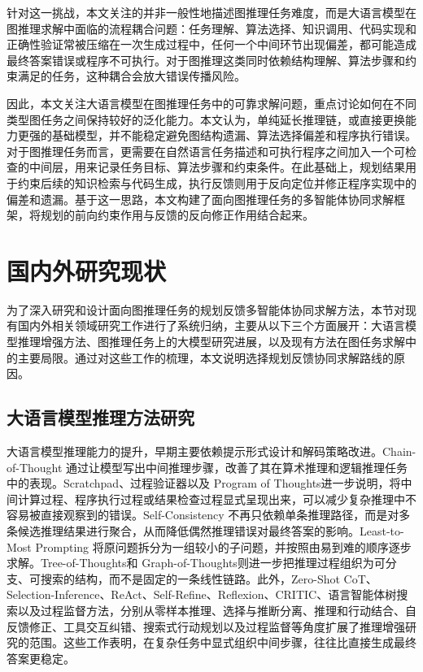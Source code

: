 针对这一挑战，本文关注的并非一般性地描述图推理任务难度，而是大语言模型在图推理求解中面临的流程耦合问题：任务理解、算法选择、知识调用、代码实现和正确性验证常被压缩在一次生成过程中，任何一个中间环节出现偏差，都可能造成最终答案错误或程序不可执行。对于图推理这类同时依赖结构理解、算法步骤和约束满足的任务，这种耦合会放大错误传播风险。

因此，本文关注大语言模型在图推理任务中的可靠求解问题，重点讨论如何在不同类型图任务之间保持较好的泛化能力。本文认为，单纯延长推理链，或直接更换能力更强的基础模型，并不能稳定避免图结构遗漏、算法选择偏差和程序执行错误。对于图推理任务而言，更需要在自然语言任务描述和可执行程序之间加入一个可检查的中间层，用来记录任务目标、算法步骤和约束条件。在此基础上，规划结果用于约束后续的知识检索与代码生成，执行反馈则用于反向定位并修正程序实现中的偏差和遗漏。基于这一思路，本文构建了面向图推理任务的多智能体协同求解框架，将规划的前向约束作用与反馈的反向修正作用结合起来。


\section{国内外研究现状}

为了深入研究和设计面向图推理任务的规划反馈多智能体协同求解方法，本节对现有国内外相关领域研究工作进行了系统归纳，主要从以下三个方面展开：大语言模型推理增强方法、图推理任务上的大模型研究进展，以及现有方法在图任务求解中的主要局限。通过对这些工作的梳理，本文说明选择规划反馈协同求解路线的原因。

\subsection{大语言模型推理方法研究}

大语言模型推理能力的提升，早期主要依赖提示形式设计和解码策略改进。Chain-of-Thought 通过让模型写出中间推理步骤，改善了其在算术推理和逻辑推理任务中的表现\cite{wei2022chain}。Scratchpad\cite{nye2021scratchpads}、过程验证器\cite{cobbe2021verifiers}以及 Program of Thoughts\cite{chen2023pot}进一步说明，将中间计算过程、程序执行过程或结果检查过程显式呈现出来，可以减少复杂推理中不容易被直接观察到的错误。Self-Consistency 不再只依赖单条推理路径，而是对多条候选推理结果进行聚合，从而降低偶然推理错误对最终答案的影响\cite{wang2023selfconsistency}。Least-to-Most Prompting 将原问题拆分为一组较小的子问题，并按照由易到难的顺序逐步求解\cite{zhou2023least}。Tree-of-Thoughts\cite{yao2023tree}和 Graph-of-Thoughts\cite{besta2024graph}则进一步把推理过程组织为可分支、可搜索的结构，而不是固定的一条线性链路。此外，Zero-Shot CoT\cite{kojima2022zeroshot}、Selection-Inference\cite{creswell2023selection}、ReAct\cite{yao2023react}、Self-Refine\cite{madaan2023selfrefine}、Reflexion\cite{shinn2023reflexion}、CRITIC\cite{critic2024}、语言智能体树搜索\cite{zhou2024lats}以及过程监督方法\cite{lightman2023processreward}，分别从零样本推理、选择与推断分离、推理和行动结合、自反馈修正、工具交互纠错、搜索式行动规划以及过程监督等角度扩展了推理增强研究的范围。这些工作表明，在复杂任务中显式组织中间步骤，往往比直接生成最终答案更稳定。

